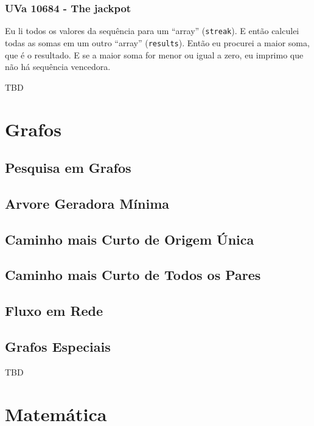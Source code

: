 \documentclass[11pt]{scrartcl}
\newcommand{\code}[1]{\texttt{\colorbox{bg_code_color}{#1}}}
\begin{document}
\subsubsection{UVa 10684 - The jackpot}
Eu li todos os valores da sequência para um ``array'' (\code{streak}). E então calculei todas as somas em um outro ``array'' (\code{results}). Então eu procurei a maior soma, que é o resultado. E se a maior soma for menor ou igual a zero, eu imprimo que não há sequência vencedora.


TBD


\section{Grafos}

\subsection{Pesquisa em Grafos}

\subsection{Arvore Geradora Mínima}

\subsection{Caminho mais Curto de Origem Única}

\subsection{Caminho mais Curto de Todos os Pares}

\subsection{Fluxo em Rede}

\subsection{Grafos Especiais}

TBD


\section{Matemática}
\end{document}
